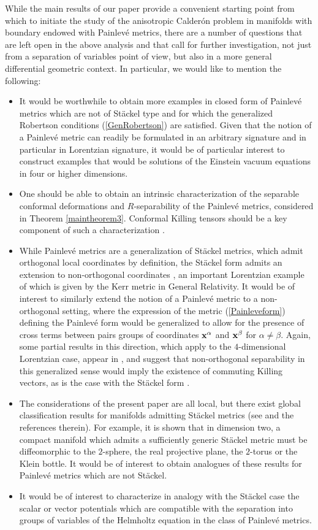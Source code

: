 \documentclass[pdftex]{sigma}
\numberwithin{equation}{section}
\begin{document}
While the main results of our paper provide a convenient starting point from which to initiate the study of the anisotropic Calder\'on problem in manifolds with boundary endowed with Painlev\'e metrics, there are a number of questions that are left open in the above analysis and that call for further investigation, not just from a separation of variables point of view, but also in a more general differential geometric context. In particular, we would like to mention the following:
\begin{itemize}\itemsep=0pt
\item It would be worthwhile to obtain more examples in closed form of Painlev\'e metrics which are not of St\"ackel type and for which the generalized Robertson conditions (\ref{GenRobertson}) are satisfied. Given that the notion of a Painlev\'e metric can readily be formulated in an arbitrary signature and in particular in Lorentzian signature, it would be of particular interest to construct examples that would be solutions of the Einstein vacuum equations in four or higher dimensions.
\item One should be able to obtain an intrinsic characterization of the separable conformal deformations and $R$-separability of the Painlev\'e metrics, considered in Theorem \ref{maintheorem3}. Conformal Killing tensors should be a key component of such a characterization \cite{CR2006, KaMi1984}.
\item While Painlev\'e metrics are a generalization of St\"ackel metrics, which admit orthogonal local coordinates by definition, the St\"ackel form admits an extension to non-orthogonal coordinates \cite{KaMi1981}, an important Lorentzian example of which is given by the Kerr metric in General Relativity. It would be of interest to similarly extend the notion of a Painlev\'e metric to a non-orthogonal setting, where the expression of the metric (\ref{Painleveform}) defining the Painlev\'e form would be generalized to allow for the presence of cross terms between pairs groups of coordinates ${\bf x}^{\alpha}$ and ${\bf x}^{\beta}$ for $\alpha\neq \beta$. Again, some partial results in this direction, which apply to the $4$-dimensional Lorentzian case, appear in \cite{HaMa1978}, and suggest that non-orthogonal separability in this generalized sense would imply the existence of commuting Killing vectors, as is the case with the St\"ackel form \cite{KaMi1981, Woo1975}.
\item The considerations of the present paper are all local, but there exist global classification results for manifolds admitting St\"ackel metrics (see \cite{Ki1997} and the references therein). For example, it is shown that in dimension two, a compact manifold which admits a sufficiently generic St\"ackel metric must be diffeomorphic to the $2$-sphere, the real projective plane, the $2$-torus or the Klein bottle. It would be of interest to obtain analogues of these results for Painlev\'e metrics which are not St\"ackel.
\item It would be of interest to characterize in analogy with the St\"ackel case the scalar or vector potentials which are compatible with the separation into groups of variables of the Helmholtz equation in the class of Painlev\'e metrics.
\end{itemize}
\end{document}
